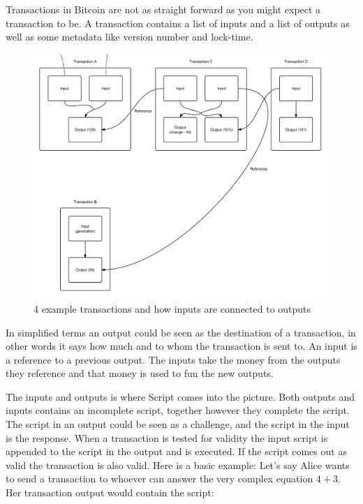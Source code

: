 \label{transactions}
Transactions in Bitcoin are not as straight forward as you might expect a transaction to be. A transaction contains a list of inputs and a list of outputs as well as some metadata like version number and lock-time. 

\begin{figure}[H]
	\centering
	\includegraphics[width=1.0\textwidth]{background/images/transaction_basic.png}
	\caption{4 example transactions and how inputs are connected to outputs}
	\label{fig:transaction_input_output}
\end{figure}

In simplified terms an output could be seen as the destination of a transaction, in other words it says how much and to whom the transaction is sent to. An input is a reference to a previous output. The inputs take the money from the outputs they reference and that money is used to fun the new outputs. 

The inputs and outputs is where Script comes into the picture. Both outputs and inputs contains an incomplete script, together however they complete the script. The script in an output could be seen as a challenge, and the script in the input is the response. When a transaction is tested for validity the input script is appended to the script in the output and is executed. If the script comes out as valid the transaction is also valid. Here is a basic example: Let's say Alice wants to send a transaction to whoever can answer the very complex equation $4+3$. Her transaction output would contain the script:

